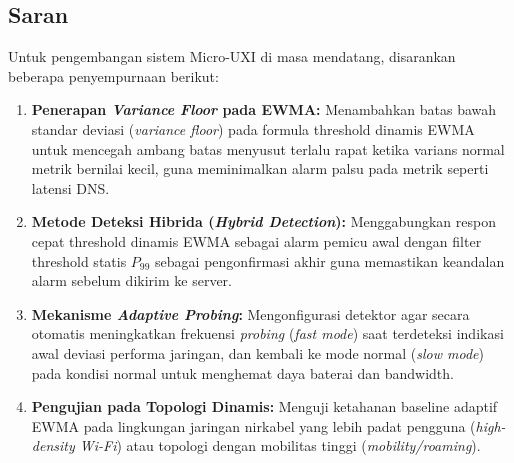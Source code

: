 \subsection{Saran}

Untuk pengembangan sistem Micro-UXI di masa mendatang, disarankan beberapa penyempurnaan berikut:

\begin{enumerate}
    \item \textbf{Penerapan \textit{Variance Floor} pada EWMA:} Menambahkan batas bawah standar deviasi (\textit{variance floor}) pada formula threshold dinamis EWMA untuk mencegah ambang batas menyusut terlalu rapat ketika varians normal metrik bernilai kecil, guna meminimalkan alarm palsu pada metrik seperti latensi DNS.
    \item \textbf{Metode Deteksi Hibrida (\textit{Hybrid Detection}):} Menggabungkan respon cepat threshold dinamis EWMA sebagai alarm pemicu awal dengan filter threshold statis $P_{99}$ sebagai pengonfirmasi akhir guna memastikan keandalan alarm sebelum dikirim ke server.
    \item \textbf{Mekanisme \textit{Adaptive Probing}:} Mengonfigurasi detektor agar secara otomatis meningkatkan frekuensi \textit{probing} (\textit{fast mode}) saat terdeteksi indikasi awal deviasi performa jaringan, dan kembali ke mode normal (\textit{slow mode}) pada kondisi normal untuk menghemat daya baterai dan bandwidth.
    \item \textbf{Pengujian pada Topologi Dinamis:} Menguji ketahanan baseline adaptif EWMA pada lingkungan jaringan nirkabel yang lebih padat pengguna (\textit{high-density Wi-Fi}) atau topologi dengan mobilitas tinggi (\textit{mobility/roaming}).
\end{enumerate}